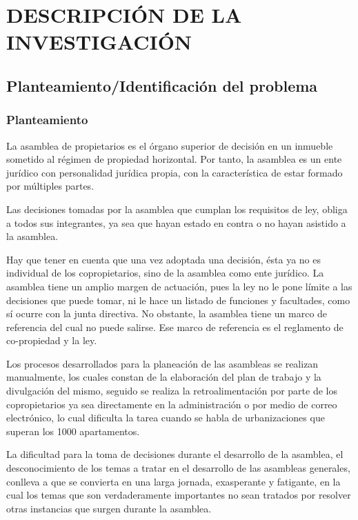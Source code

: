 \chapter{DESCRIPCIÓN DE LA INVESTIGACIÓN}
\section{Planteamiento/Identificación del problema}

\subsection{Planteamiento}

La asamblea de propietarios es el órgano superior de decisión en un inmueble sometido al régimen de propiedad horizontal. Por tanto, la asamblea es un ente jurídico con personalidad jurídica propia, con la característica de estar formado por múltiples partes.

Las decisiones tomadas por la asamblea que cumplan los requisitos de ley, obliga a todos sus integrantes, ya sea que hayan estado en contra o no hayan asistido a la asamblea.

Hay que tener en cuenta que una vez adoptada una decisión, ésta ya no es individual de los copropietarios, sino de la asamblea como ente jurídico. La asamblea tiene un amplio margen de actuación, pues la ley no le pone límite a las decisiones que puede tomar, ni le hace un listado de funciones y facultades, como sí ocurre con la junta directiva. No obstante, la asamblea tiene un marco de referencia del cual no puede salirse. Ese marco de referencia es el reglamento de co-propiedad y la ley. 

Los procesos desarrollados para la planeación de las asambleas se realizan manualmente, los cuales constan de la elaboración del plan de trabajo y la divulgación del mismo, seguido se realiza la retroalimentación por parte de los copropietarios ya sea directamente en la administración o por medio de correo electrónico, lo cual dificulta la tarea cuando se habla de urbanizaciones que superan los 1000 apartamentos.

La dificultad para la toma de decisiones durante el desarrollo de la asamblea, el desconocimiento de los temas a tratar en el desarrollo de las asambleas generales, conlleva a que se convierta en una larga jornada, exasperante y fatigante, en la cual los temas que son verdaderamente importantes no sean tratados por resolver otras instancias que surgen durante la asamblea.


